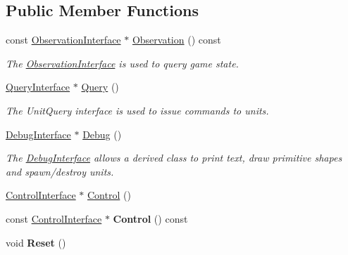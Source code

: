 \subsection*{Public Member Functions}
\begin{DoxyCompactItemize}
\item 
\mbox{\label{classsc2_1_1_client_a9bde4735245a945f37c5505cde5d09c1}} 
const \hyperlink{classsc2_1_1_observation_interface}{Observation\+Interface} $\ast$ \hyperlink{classsc2_1_1_client_a9bde4735245a945f37c5505cde5d09c1}{Observation} () const
\begin{DoxyCompactList}\small\item\em The \hyperlink{classsc2_1_1_observation_interface}{Observation\+Interface} is used to query game state. \end{DoxyCompactList}\item 
\mbox{\label{classsc2_1_1_client_acdc61fe5c58e0a8f4f246d8fbcc5cefc}} 
\hyperlink{classsc2_1_1_query_interface}{Query\+Interface} $\ast$ \hyperlink{classsc2_1_1_client_acdc61fe5c58e0a8f4f246d8fbcc5cefc}{Query} ()
\begin{DoxyCompactList}\small\item\em The Unit\+Query interface is used to issue commands to units. \end{DoxyCompactList}\item 
\mbox{\label{classsc2_1_1_client_ac42601e18b7c109f6f0e58a7780a79ac}} 
\hyperlink{classsc2_1_1_debug_interface}{Debug\+Interface} $\ast$ \hyperlink{classsc2_1_1_client_ac42601e18b7c109f6f0e58a7780a79ac}{Debug} ()
\begin{DoxyCompactList}\small\item\em The \hyperlink{classsc2_1_1_debug_interface}{Debug\+Interface} allows a derived class to print text, draw primitive shapes and spawn/destroy units. \end{DoxyCompactList}\item 
\hyperlink{classsc2_1_1_control_interface}{Control\+Interface} $\ast$ \hyperlink{classsc2_1_1_client_a741b9dd091f11694dd814c9b01f86dd8}{Control} ()
\item 
\mbox{\label{classsc2_1_1_client_a90089d27b898fe537ccee87def3cec4b}} 
const \hyperlink{classsc2_1_1_control_interface}{Control\+Interface} $\ast$ {\bfseries Control} () const
\item 
\mbox{\label{classsc2_1_1_client_a3c44d74271f1cae11334a97849ed4da9}} 
void {\bfseries Reset} ()
\end{DoxyCompactItemize}


